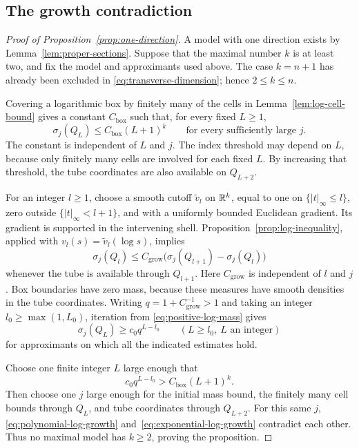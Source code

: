 \subsection{The growth contradiction}

\begin{proof}[Proof of Proposition~\ref{prop:one-direction}]
A model with one direction exists by Lemma~\ref{lem:proper-sections}.
Suppose that the maximal number \(k\) is at least two, and fix the model
and approximants used above.  The case \(k=n+1\) has already been
excluded in \eqref{eq:transverse-dimension}; hence \(2\le k\le n\).

Covering a logarithmic box by finitely many of the cells in
Lemma~\ref{lem:log-cell-bound} gives a constant \(C_{\mathrm{box}}\)
such that, for every fixed \(L\ge1\),
\begin{equation}\label{eq:polynomial-log-growth}
 \sigma_j(Q_L)\le C_{\mathrm{box}}(L+1)^k
 \qquad\text{for every sufficiently large }j.
\end{equation}
The constant is independent of \(L\) and \(j\).  The index threshold may
depend on \(L\), because only finitely many cells are involved for each
fixed \(L\).  By increasing that threshold, the tube coordinates are
also available on \(Q_{L+2}\).

For an integer \(l\ge1\), choose a smooth cutoff
\(\widetilde v_l\) on \(\mathbb R^k\), equal to one on
\(\{|t|_\infty\le l\}\), zero outside
\(\{|t|_\infty<l+1\}\), and with a uniformly bounded Euclidean gradient.
Its gradient is supported in the intervening shell.
Proposition~\ref{prop:log-inequality}, applied with
\(v_l(s)=\widetilde v_l(\log s)\), implies
\[
 \sigma_j(Q_l)
       \le C_{\mathrm{grow}}
            \bigl(\sigma_j(Q_{l+1})-\sigma_j(Q_l)\bigr)
\]
whenever the tube is available through \(Q_{l+1}\).
Here \(C_{\mathrm{grow}}\) is independent of \(l\) and \(j\).
Box boundaries have zero mass, because these measures have smooth
densities in the tube coordinates.
Writing \(q=1+C_{\mathrm{grow}}^{-1}>1\) and taking an integer
\(l_0\ge\max(1,L_0)\), iteration from
\eqref{eq:positive-log-mass} gives
\begin{equation}\label{eq:exponential-log-growth}
 \sigma_j(Q_L)\ge c_0 q^{L-l_0}
 \qquad(L\ge l_0,\ L\text{ an integer})
\end{equation}
for approximants on which all the indicated estimates hold.

Choose one finite integer \(L\) large enough that
\[
 c_0q^{L-l_0}>C_{\mathrm{box}}(L+1)^k.
\]
Then choose one \(j\) large enough for the initial mass bound, the
finitely many cell bounds through \(Q_L\), and tube coordinates through
\(Q_{L+2}\).  For this same \(j\),
\eqref{eq:polynomial-log-growth} and~\eqref{eq:exponential-log-growth}
contradict each other.  Thus no maximal model has \(k\ge2\), proving
the proposition.
\end{proof}
